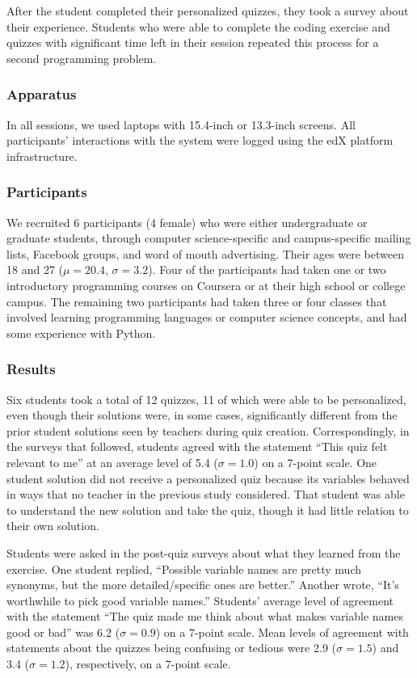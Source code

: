 After the student completed their personalized quizzes, they took a survey about their experience. Students who were able to complete the coding exercise and quizzes with significant time left in their session repeated this process for a second programming problem.

\subsubsection{Apparatus}

In all sessions, we used laptops with 15.4-inch or 13.3-inch screens. All participants' interactions with the system were logged using the edX platform infrastructure.

\subsubsection{Participants}

We recruited 6 participants (4 female) who were either undergraduate or graduate students, through computer science-specific and campus-specific mailing lists, Facebook groups, and word of mouth advertising. Their ages were between 18 and 27 ($\mu=20.4$, $\sigma=3.2$). Four of the participants had taken one or two introductory programming courses on Coursera or at their high school or college campus. The remaining two participants had taken three or four classes that involved learning programming languages or computer science concepts, and had some experience with Python.

\subsubsection{Results}

Six students took a total of 12 quizzes, 11 of which were able to be personalized, even though their solutions were, in some cases, significantly different from the prior student solutions seen by teachers during quiz creation. Correspondingly, in the surveys that followed, students agreed with the statement ``This quiz felt relevant to me'' at an average level of 5.4 ($\sigma = 1.0$) on a 7-point scale. One student solution did not receive a personalized quiz because its variables behaved in ways that no teacher in the previous study considered. That student was able to understand the new solution and take the quiz, though it had little relation to their own solution.

Students were asked in the post-quiz surveys about what they learned from the exercise. One student replied, ``Possible variable names are pretty much synonyms, but the more detailed/specific ones are better.'' Another wrote, ``It's worthwhile to pick good variable names.'' Students' average level of agreement with the statement ``The quiz made me think about what makes variable names good or bad'' was 6.2 ($\sigma = 0.9$) on a 7-point scale. Mean levels of agreement with statements about the quizzes being confusing or tedious were 2.9 ($\sigma = 1.5$) and 3.4 ($\sigma = 1.2$), respectively, on a 7-point scale.

